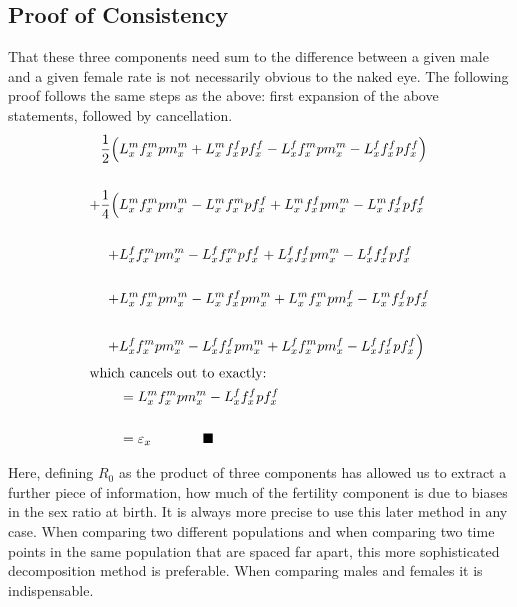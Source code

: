 \documentclass{article}
\begin{document}
\subsection{Proof of Consistency}
That these three components need sum to the difference between a given male and a given female rate is not necessarily obvious to the naked eye. The following proof follows the same steps as the above: first expansion of the above statements, followed by cancellation.
\begin{align}
\frac{1}{2}\Big(& L^{m}_{x}f^{m}_{x}pm^{m}_{x} + L^{m}_{x}f^{f}_{x}pf^{f}_{x} - L^{f}_{x}f^{m}_{x}pm^{m}_{x} - L^{f}_{x}f^{f}_{x}pf^{f}_{x}\Big) \notag \\ \notag \\
+ \frac{1}{4}\Big(& L^{m}_{x}f^{m}_{x}pm^{m}_{x} - L^{m}_{x}f^{m}_{x}pf^{f}_{x} + L^{m}_{x}f^{f}_{x}pm^{m}_{x} - L^{m}_{x}f^{f}_{x}pf^{f}_{x} \notag \\ \notag \\
+& L^{f}_{x}f^{m}_{x}pm^{m}_{x} - L^{f}_{x}f^{m}_{x}pf^{f}_{x} + L^{f}_{x}f^{f}_{x}pm^{m}_{x} - L^{f}_{x}f^{f}_{x}pf^{f}_{x}  \notag \\ \notag \\
+& L^{m}_{x}f^{m}_{x}pm^{m}_{x} - L^{m}_{x}f^{f}_{x}pm^{m}_{x} + L^{m}_{x}f^{m}_{x}pm^{f}_{x} - L^{m}_{x}f^{f}_{x}pf^{f}_{x} \notag \\ \notag \\
+& L^{f}_{x}f^{m}_{x}pm^{m}_{x} - L^{f}_{x}f^{f}_{x}pm^{m}_{x} + L^{f}_{x}f^{m}_{x}pm^{f}_{x} - L^{f}_{x}f^{f}_{x}pf^{f}_{x}\Big) \notag \\ 
\intertext{which cancels out to exactly:}
&= L^{m}_{x}f^{m}_{x}pm^{m}_{x} - L^{f}_{x}f^{f}_{x}pf^{f}_{x} \notag \\ \notag \\
&= \varepsilon _{x}{~~~~~~~~~~~}\blacksquare
\end{align}

Here, defining $R_{0}$ as the product of three components has allowed us to extract a further piece of information, how much of the fertility component is due to biases in the sex ratio at birth. It is always more precise to use this later method in any case. When comparing two different populations and when comparing two time points in the same population that are spaced far apart, this more sophisticated decomposition method is preferable.  When comparing males and females it is indispensable.
\end{document}
